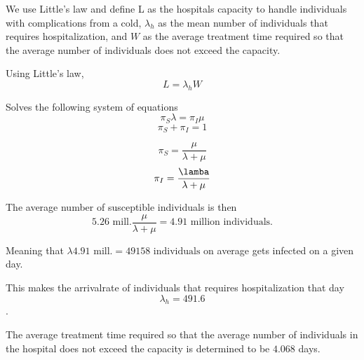 We use Little's law and define L as the hospitals capacity to handle individuals with complications from a cold, $\lambda_h$ as the mean number of individuals that requires hospitalization, and $W$ as the average treatment time required so that the average number of individuals does not exceed the capacity. 

Using Little's law, 
$$L = \lambda_h W$$

Solves the following system of equations
$$ \pi_S \lambda = \pi_I \mu$$ 
$$ \pi_S + \pi_I = 1 $$

$$\pi_S = \frac{\mu}{\lambda + \mu} $$
$$ \pi_I = \frac{\lamba}{\lambda+\mu} $$


The average number of susceptible individuals is then 
$$ 5.26 \text{ mill.} \frac{\mu}{\lambda + \mu} = 4.91 \text{ million individuals.}$$

Meaning that $\lambda 4.91 \text{ mill.} = 49158 \text{ individuals}$ on average gets infected on a given day. 

This makes the arrivalrate of individuals that requires hospitalization that day
$$\lambda_h = 491.6$$. 

The average treatment time required so that the average number of individuals in the hospital does not exceed the capacity is determined to be $4.068$ days. 



